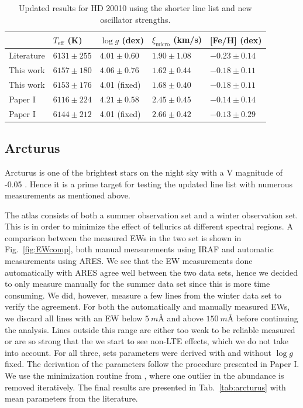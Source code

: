 \documentclass{aa}
\begin{document}
\begin{table}[htb!]
    \caption{Updated results for HD 20010 using the shorter line list and new
             oscillator strengths.}
    \label{tab:hd20010}
    \centering
    \begin{tabular}{lllll}
      \hline\hline
                      & $T_\mathrm{eff}$ (K) &  $\log g$ (dex)  &   $\xi_\mathrm{micro}$ (km/s)   & [Fe/H] (dex)     \\
      \hline
        Literature    & $6131 \pm 255$       &  $4.01 \pm 0.60$ &    $1.90 \pm 1.08$              & $-0.23 \pm 0.14$ \\
      \hline
        This work     & $6157 \pm 180$       &  $4.06 \pm 0.76$ &    $1.62 \pm 0.44$              & $-0.18 \pm 0.11$ \\
        This work     & $6153 \pm 176$       &   4.01 (fixed)   &    $1.68 \pm 0.40$              & $-0.18 \pm 0.11$ \\
      \hline
        Paper I       & $6116 \pm 224$       &  $4.21 \pm 0.58$ &    $2.45 \pm 0.45$              & $-0.14 \pm 0.14$ \\
        Paper I       & $6144 \pm 212$       &   4.01 (fixed)   &    $2.66 \pm 0.42$              & $-0.13 \pm 0.29$ \\
      \hline
    \end{tabular}
\end{table}




\subsection{Arcturus}
\label{sec:arcturus}

Arcturus is one of the brightest stars on the night sky with a V magnitude of
-0.05 \citep{Ducati2002}. Hence it is a prime target for testing the updated
line list with numerous measurements as mentioned above.

The atlas consists of both a summer observation set and a winter observation
set. This is in order to minimize the effect of tellurics at different spectral
regions. A comparison between the measured EWs in the two set is shown in
Fig.~\ref{fig:EWcomp}, both manual measurements using IRAF and automatic
measurements using ARES. We see that the EW measurements done automatically with
ARES agree well between the two data sets, hence we decided to only measure
manually for the summer data set since this is more time consuming. We did,
however, measure a few lines from the winter data set to verify the agreement.
For both the automatically and manually measured EWs, we discard all lines with
an EW below $\SI{5}{m}$\AA{} and above $\SI{150}{m}$\AA{} before continuing the
analysis. Lines outside this range are either too weak to be reliable measured
or are so strong that the we start to see non-LTE effects, which we do not take
into account. For all three, sets parameters were derived with and without $\log
g$ fixed. The derivation of the parameters follow the procedure presented in
Paper I. We use the minimization routine from \citep{Andreasen2017a}, where one
outlier in the abundance is removed iteratively. The final results are presented
in Tab.~\ref{tab:arcturus} with mean parameters from the literature.
\end{document}

